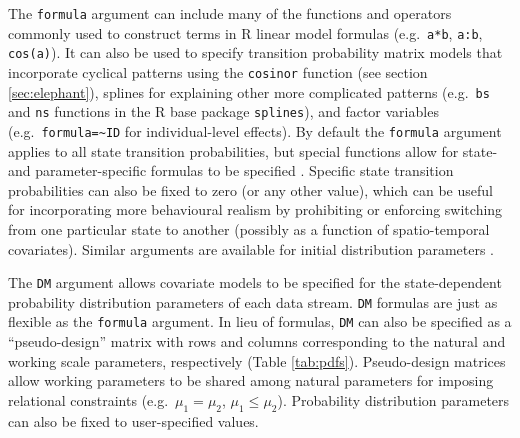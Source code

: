 \documentclass[12pt]{article}\usepackage[]{graphicx}\usepackage[]{color}
\begin{document}
The \verb|formula| argument can include many of the functions and operators commonly used to construct terms in R linear model formulas (e.g.\ \verb|a*b|, \verb|a:b|, \verb|cos(a)|). It can also be used to specify transition probability matrix models that incorporate cyclical patterns using the \verb|cosinor| function (see section \ref{sec:elephant}), splines for explaining other more complicated patterns (e.g.\ \verb|bs| and \verb|ns| functions in the R base package \verb|splines|), and factor variables (e.g.\ \verb|formula=~ID| for individual-level effects).  By default the \verb|formula| argument applies to all state transition probabilities, but special functions allow for state- and parameter-specific formulas to be specified%
. Specific state transition probabilities can also be fixed to zero (or any other value), which can be useful for incorporating more behavioural realism by prohibiting or enforcing switching from one particular state to another (possibly as a function of spatio-temporal covariates). Similar arguments are available for %
initial distribution parameters%
. 

The \verb|DM| argument allows covariate models to be specified for the state-dependent probability distribution parameters of each data stream. %
\verb|DM| formulas are just as flexible as the \verb|formula| argument. %
In lieu of formulas, \verb|DM| can also be specified as a ``pseudo-design'' matrix with rows and columns corresponding to the natural and working scale parameters, respectively (Table \ref{tab:pdfs}). %
Pseudo-design matrices allow working parameters to be shared among natural parameters for imposing relational constraints (e.g.\ $\mu_1 = \mu_2$, $\mu_1 \le \mu_2$). Probability distribution parameters can also be fixed to user-specified values.
\end{document}
